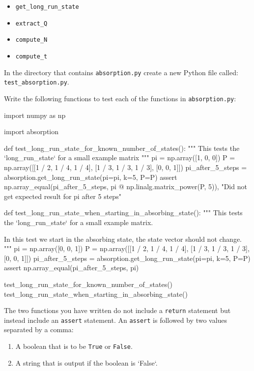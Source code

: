 \begin{itemize}
\item 

\texttt{get\_long\_run\_state}

\item 

\texttt{extract\_Q}

\item 

\texttt{compute\_N}

\item 

\texttt{compute\_t}

\end{itemize}


In the directory that contains \texttt{absorption.py} create a new Python
file called: \texttt{test\_absorption.py}.


Write the following functions to test each of the functions in
\texttt{absorption.py}:

\begin{python}
import numpy as np

import absorption

def test_long_run_state_for_known_number_of_states():
    """
    This tests the `long_run_state` for a small example matrix
    """
    pi = np.array([1, 0, 0])
    P = np.array([[1 / 2, 1 / 4, 1 / 4], [1 / 3, 1 / 3, 1 / 3], [0, 0, 1]])
    pi_after_5_steps = absorption.get_long_run_state(pi=pi, k=5, P=P)
    assert np.array_equal(pi_after_5_steps, pi @ np.linalg.matrix_power(P, 5)), "Did not get expected result for pi after 5 steps"


def test_long_run_state_when_starting_in_absorbing_state():
    """
    This tests the `long_run_state` for a small example matrix.

    In this test we start in the absorbing state, the state vector should not
    change.
    """
    pi = np.array([0, 0, 1])
    P = np.array([[1 / 2, 1 / 4, 1 / 4], [1 / 3, 1 / 3, 1 / 3], [0, 0, 1]])
    pi_after_5_steps = absorption.get_long_run_state(pi=pi, k=5, P=P)
    assert np.array_equal(pi_after_5_steps, pi)


test_long_run_state_for_known_number_of_states()
test_long_run_state_when_starting_in_absorbing_state()
\end{python}


\begin{note}
The two functions you have written do not include a \texttt{return} statement but
instead include an \texttt{assert} statement. An \texttt{assert} is followed by two values
separated by a comma:
\begin{enumerate}

\item 

A boolean that is to be \texttt{True} or \texttt{False}.

\item 

A string that is output if the boolean is `False`.

\end{enumerate}
\end{note}



